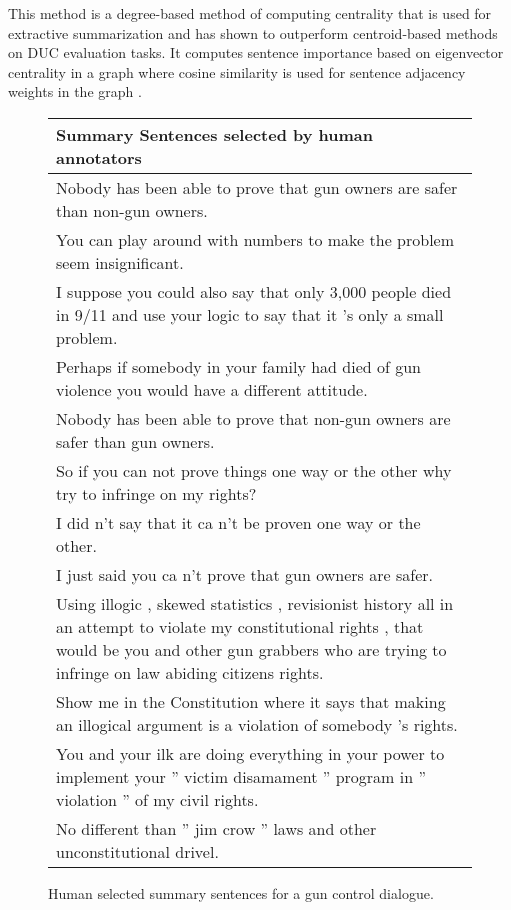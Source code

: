 \documentclass[11pt]{article}
\begin{document}
 This method is a degree-based method of computing
centrality that is used for extractive summarization and has shown to
outperform centroid-based methods on DUC evaluation tasks.  It
computes sentence importance based on eigenvector centrality in a
graph where cosine similarity is used for sentence adjacency weights
in the graph \cite{erkan2004lexrank}.

\begin{figure}[th!]
\begin{small}
{\begin{tabular}{|p{2.8in}|}

\hline {\bf  Summary Sentences selected by human annotators }  \\ \hline \hline
Nobody has been able to prove that gun owners are safer than non-gun owners.  \\  \hline
You can play around with numbers to make the problem seem insignificant.  \\  \hline
I suppose you could also say that only 3,000 people died in 9/11 and use your logic to say that it 's only a small problem.  \\  \hline
Perhaps if somebody in your family had died of gun violence you would have a different attitude. \\  \hline
Nobody has been able to prove that non-gun owners are safer than gun owners.  \\  \hline
So if you can not prove things one way or the other why try to infringe on my rights?  \\  \hline
I did n't say that it ca n't be proven one way or the other.  \\  \hline
I just said you ca n't prove that gun owners are safer.  \\  \hline
Using illogic , skewed statistics , revisionist history all in an attempt to violate my constitutional rights , that would be you and other gun grabbers who are trying to infringe on law abiding citizens rights.  \\  \hline
Show me in the Constitution where it says that making an illogical argument is a violation of somebody 's rights.  \\  \hline
You and your ilk are doing everything in your power to implement your '' victim disamament '' program in '' violation '' of my civil rights.  \\  \hline
No different than '' jim crow '' laws and other unconstitutional drivel. \\  \hline

\end{tabular}}
\end{small}
\caption{\label{gold-std} Human selected summary sentences for a gun control dialogue.}
\end{figure}
\end{document}
